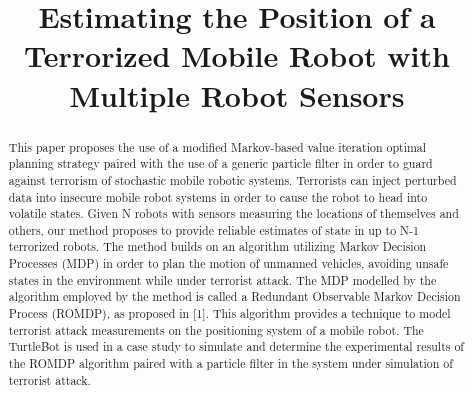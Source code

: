 \documentclass[conference]{IEEEtran}
\begin{document}
\title{Estimating the Position of a Terrorized Mobile Robot with Multiple Robot Sensors}


\author{
}

\maketitle

\begin{abstract}
This paper proposes the use of a modified Markov-based value iteration optimal planning strategy
paired with the use of a generic particle filter in order to guard against terrorism of stochastic
mobile robotic systems. Terrorists can inject perturbed data into insecure mobile robot systems in order
to cause the robot to head into volatile states. Given N robots with sensors measuring
the locations of themselves and others, our method proposes to provide
reliable estimates of state in up to N-1 terrorized robots. The method builds on an algorithm
utilizing Markov Decision Processes (MDP) in order to plan the motion of unmanned vehicles, avoiding
unsafe states in the environment while under terrorist attack. The MDP modelled by the algorithm employed
by the method is called a Redundant Observable Markov Decision Process (ROMDP), as proposed in [1].
This algorithm provides a technique to model terrorist attack measurements on the positioning system of a
mobile robot. The TurtleBot is used in a case study to simulate and determine the experimental results of
the ROMDP algorithm paired with a particle filter in the system under simulation of terrorist attack.
\end{abstract}
\end{document}
